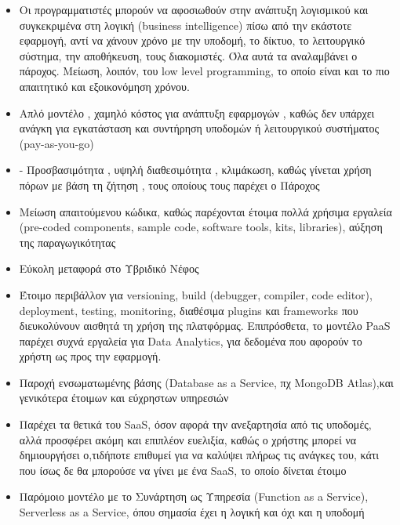 \documentclass{article}
\begin{document}
\begin{itemize}
\item Οι προγραμματιστές μπορούν να αφοσιωθούν στην ανάπτυξη λογισμικού
και συγκεκριμένα στη λογική (business
intelligence) πίσω από την εκάστοτε εφαρμογή, αντί
να χάνουν χρόνο με την υποδομή, το δίκτυο, το λειτουργικό σύστημα, την
αποθήκευση, τους διακομιστές. Όλα αυτά τα αναλαμβάνει ο πάροχος. Μείωση,
λοιπόν, του low level 
programming, το οποίο είναι και το πιο απαιτητικό
και εξοικονόμηση χρόνου.
\item Απλό μοντέλο , χαμηλό κόστος για ανάπτυξη εφαρμογών , καθώς δεν
υπάρχει ανάγκη για εγκατάσταση και συντήρηση υποδομών ή λειτουργικού
συστήματος  (pay-as-you-go)
\item-        Προσβασιμότητα , υψηλή διαθεσιμότητα , κλιμάκωση, καθώς γίνεται
χρήση πόρων με βάση τη ζήτηση , τους οποίους τους παρέχει ο Πάροχος
\item Μείωση απαιτούμενου κώδικα, καθώς παρέχονται έτοιμα πολλά χρήσιμα
εργαλεία (pre-coded components, sample code,
software tools, kits, libraries), αύξηση της
παραγωγικότητας
\item Εύκολη μεταφορά στο Υβριδικό Νέφος
\item Έτοιμο περιβάλλον για versioning, build
(debugger, compiler, code editor), deployment, testing,
monitoring, διαθέσιμα
plugins και
frameworks που διευκολύνουν
αισθητά τη χρήση της πλατφόρμας. Επιπρόσθετα,  το μοντέλο
PaaS παρέχει συχνά εργαλεία
για Data Analytics, για
δεδομένα που αφορούν το χρήστη ως προς την εφαρμογή.
\item Παροχή ενσωματωμένης βάσης (Database as a
Service, πχ MongoDB
Atlas),και γενικότερα έτοιμων και εύχρηστων
υπηρεσιών
\item Παρέχει τα θετικά του SaaS,
όσον αφορά την ανεξαρτησία από τις υποδομές, αλλά
προσφέρει ακόμη και επιπλέον ευελιξία, καθώς ο χρήστης μπορεί να
δημιουργήσει ο,τιδήποτε επιθυμεί για να καλύψει πλήρως τις ανάγκες του,
κάτι που ίσως δε θα μπορούσε να γίνει με ένα
SaaS, το οποίο δίνεται έτοιμο
\item Παρόμοιο μοντέλο με το Συνάρτηση ως Υπηρεσία
(Function as a Service), Serverless as a Service,
όπου σημασία έχει η λογική και όχι και η υποδομή
\end{itemize}
\end{document}
